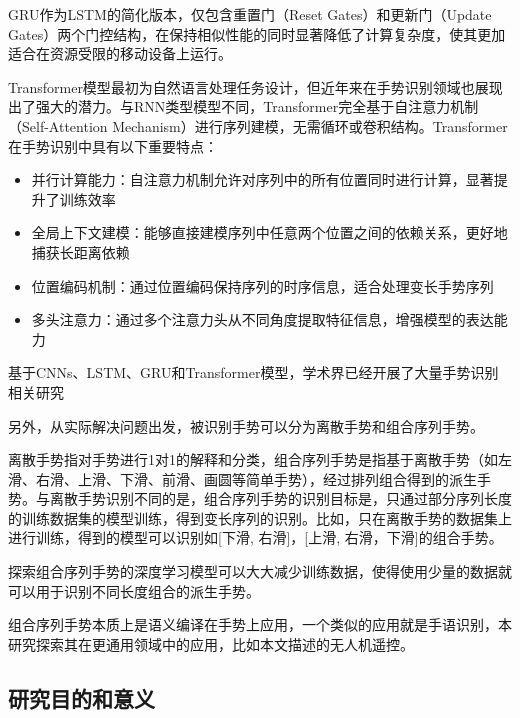 GRU\cite{cho2014learning}作为LSTM的简化版本，仅包含重置门（Reset Gates）和更新门（Update Gates）两个门控结构，在保持相似性能的同时显著降低了计算复杂度，使其更加适合在资源受限的移动设备上运行。

Transformer模型\cite{vaswani2017attention}最初为自然语言处理任务设计，但近年来在手势识别领域也展现出了强大的潜力。与RNN类型模型不同，Transformer完全基于自注意力机制（Self-Attention Mechanism）进行序列建模，无需循环或卷积结构。Transformer在手势识别中具有以下重要特点：
\begin{itemize}
    \item 并行计算能力：自注意力机制允许对序列中的所有位置同时进行计算，显著提升了训练效率
    \item 全局上下文建模：能够直接建模序列中任意两个位置之间的依赖关系，更好地捕获长距离依赖
    \item 位置编码机制：通过位置编码保持序列的时序信息，适合处理变长手势序列
    \item 多头注意力：通过多个注意力头从不同角度提取特征信息，增强模型的表达能力
\end{itemize}

基于CNNs、LSTM、GRU和Transformer模型，学术界已经开展了大量手势识别相关研究\cite{jiang2022multi,chen2024bilstm,chen2024ultra,li2022research,kavarthapu2017hand,valarezo2021hand,d2020transformer,wang2024continuous}

另外，从实际解决问题出发，被识别手势可以分为离散手势\cite{jiang2022multi,chen2024bilstm,chen2024ultra,li2022research,valarezo2021hand,d2020transformer,wang2024continuous}和组合序列手势\cite{kavarthapu2017hand}。

离散手势指对手势进行1对1的解释和分类，组合序列手势是指基于离散手势（如左滑、右滑、上滑、下滑、前滑、画圆等简单手势），经过排列组合得到的派生手势。与离散手势识别不同的是，组合序列手势的识别目标是，只通过部分序列长度的训练数据集的模型训练，得到变长序列的识别。比如，只在离散手势的数据集上进行训练，得到的模型可以识别如[下滑, 右滑]，[上滑, 右滑，下滑]的组合手势。

探索组合序列手势的深度学习模型可以大大减少训练数据，使得使用少量的数据就可以用于识别不同长度组合的派生手势。

组合序列手势本质上是语义编译在手势上应用，一个类似的应用就是手语识别，本研究探索其在更通用领域中的应用，比如本文描述的无人机遥控。

\subsection{研究目的和意义}

